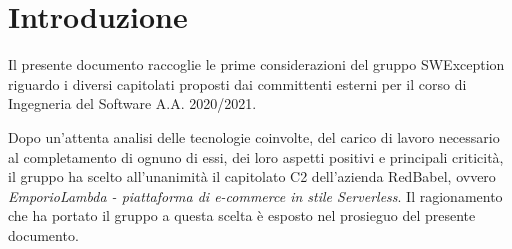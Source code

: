 \section{Introduzione}
Il presente documento raccoglie le prime considerazioni del gruppo SWException riguardo
i diversi capitolati proposti dai committenti esterni per il corso di Ingegneria
del Software A.A. 2020/2021.

Dopo un'attenta analisi delle tecnologie coinvolte, del carico di lavoro necessario
al completamento di ognuno di essi, dei loro aspetti positivi e principali criticità,
il gruppo ha scelto all'unanimità il capitolato C2 dell'azienda RedBabel, ovvero
\textit{EmporioLambda - piattaforma di e-commerce in stile Serverless}.
Il ragionamento che ha portato il gruppo a questa scelta è esposto nel prosieguo del
presente documento. 